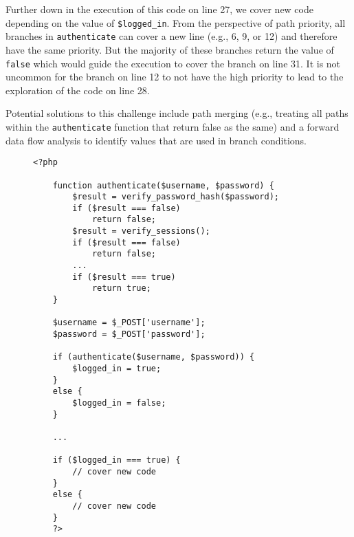 Further down in the execution of this code on line 27, we cover new code depending on the value of \texttt{\$logged\_in}. 
From the perspective of path priority, all branches in \texttt{authenticate} can cover a new line (e.g., 6, 9, or 12) and therefore have the same priority. 
But the majority of these branches return the value of \texttt{false} which would guide the execution to cover the branch on line 31. 
It is not uncommon for the branch on line 12 to not have the high priority to lead to the exploration of the code on line 28. 

Potential solutions to this challenge include path merging (e.g., treating all paths within the \texttt{authenticate} function that return false as the same) and a forward data flow analysis to identify values that are used in branch conditions. 



\begin{figure}[t]
    \begin{lstlisting}[frame=single, caption={Demonstrating symbolic branches that affect the code coverage in later parts of the code},captionpos=b, label={listing:path_explosion}]
    <?php

    function authenticate($username, $password) {
        $result = verify_password_hash($password);
        if ($result === false) 
            return false;
        $result = verify_sessions();
        if ($result === false) 
            return false;
        ...
        if ($result === true)
            return true;
    }

    $username = $_POST['username'];
    $password = $_POST['password'];

    if (authenticate($username, $password)) {
        $logged_in = true;
    }
    else {
        $logged_in = false;
    }

    ...

    if ($logged_in === true) {
        // cover new code
    }
    else {
        // cover new code
    }
    ?>
    \end{lstlisting}
\end{figure}